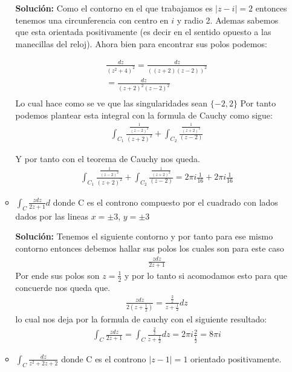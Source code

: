 \documentclass[12pt]{exam}
\begin{document}
\begin{enumerate}
\begin{itemize}
    \textbf{Solución: } Como el contorno en el que trabajamos es $|z-i|=2$ entonces tenemos una circunferencia con 
    centro en $i$ y radio 2. Ademas sabemos que esta orientada positivamente (es decir en el sentido opuesto a las manecillas
    del reloj). Ahora bien para encontrar sus polos podemos:

    \begin{align*}
        &\frac{dz}{(z^2+4)^2}=\frac{dz}{((z+2)(z-2))^2}\\
        &=\frac{dz}{(z+2)^2(z-2)^2}\\
    \end{align*}
    Lo cual hace como se ve que las singularidades sean $\{-2,2\}$ Por tanto podemos plantear esta integral con la formula
    de Cauchy como sigue:
    \begin{align*}
        &\int_{C_1} \frac{\frac{1}{(z-2)^2}}{(z+2)^2} + \int_{C_2}\frac{\frac{1}{(z+2)^2}}{(z-2)}
    \end{align*}
    
    Y por tanto con el teorema de Cauchy nos queda.
    \begin{align*}
        &\int_{C_1} \frac{\frac{1}{(z-2)^2}}{(z+2)^2} + \int_{C_2}\frac{\frac{1}{(z+2)^2}}{(z-2)} = 2\pi i \frac{1}{16} + 2\pi i \frac{1}{16}
    \end{align*}
    \item $\int_C \frac{zdz}{2z+1} d$ donde C es el controno compuesto por el cuadrado con lados dados 
    por las lineas $x=\pm 3$, $y=\pm 3$

    \textbf{Solución: }Tenemos el siguiente contorno
    y por tanto para ese mismo contorno entonces debemos hallar sus polos los cuales son para este caso
    \begin{align*}
        &\frac{z dz}{2z+1}
    \end{align*}
    Por ende sus polos son $z=\frac{1}{2}$ y por lo tanto si acomodamos esto para que concuerde nos queda que.
    \begin{align*}
        &\frac{z dz}{2(z+\frac{1}{2})}=\frac{\frac{2}{z}}{z+\frac{1}{2}}dz
    \end{align*}
    lo cual nos deja por la formula de cauchy con el siguiente resultado:
    \begin{align*}
        &\int_C \frac{zdz}{2z+1}=\int_C \frac{\frac{2}{z}}{z+\frac{1}{2}}dz = 2 \pi i \frac{2}{\frac{1}{2}} = 8 \pi i
    \end{align*}
    \item $\int_C \frac{dz}{z^2+2z+2}$ donde C es el controno $|z-1|=1$ orientado positivamente.
    

\end{itemize}
\end{enumerate}
\end{document}
